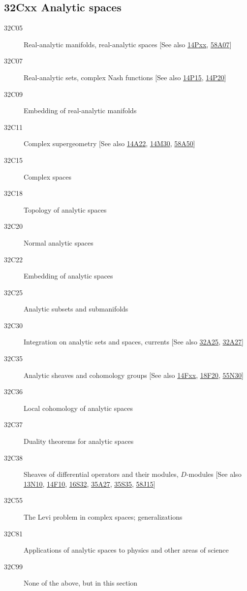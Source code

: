 \documentclass[letterpaper]{article}
\begin{document}
\subsection*{32Cxx  Analytic spaces }\label{32Cxx}
\begin{description}  
\item [32C05]\label{32C05} Real-analytic manifolds, real-analytic spaces [See also \hyperref[14Pxx]{14Pxx}, \hyperref[58A07]{58A07}]
\item [32C07]\label{32C07} Real-analytic sets, complex Nash functions [See also \hyperref[14P15]{14P15}, \hyperref[14P20]{14P20}]
\item [32C09]\label{32C09} Embedding of real-analytic manifolds
\item [32C11]\label{32C11} Complex supergeometry [See also \hyperref[14A22]{14A22}, \hyperref[14M30]{14M30}, \hyperref[58A50]{58A50}]
\item [32C15]\label{32C15} Complex spaces
\item [32C18]\label{32C18} Topology of analytic spaces
\item [32C20]\label{32C20} Normal analytic spaces
\item [32C22]\label{32C22} Embedding of analytic spaces
\item [32C25]\label{32C25} Analytic subsets and submanifolds
\item [32C30]\label{32C30} Integration on analytic sets and spaces, currents [See also \hyperref[32A25]{32A25}, \hyperref[32A27]{32A27}]
\item [32C35]\label{32C35} Analytic sheaves and cohomology groups [See also \hyperref[14Fxx]{14Fxx}, \hyperref[18F20]{18F20}, \hyperref[55N30]{55N30}]
\item [32C36]\label{32C36} Local cohomology of analytic spaces
\item [32C37]\label{32C37} Duality theorems for analytic spaces
\item [32C38]\label{32C38} Sheaves of differential operators and their modules, $D$-modules [See also \hyperref[13N10]{13N10}, \hyperref[14F10]{14F10}, \hyperref[16S32]{16S32}, \hyperref[35A27]{35A27}, \hyperref[35S35]{35S35}, \hyperref[58J15]{58J15}]
\item [32C55]\label{32C55} The Levi problem in complex spaces; generalizations
\item [32C81]\label{32C81} Applications of analytic spaces to physics and other areas of science
\item [32C99]\label{32C99} None of the above, but in this section
\end{description}
\end{document}
